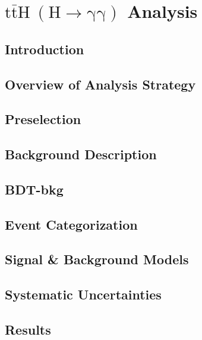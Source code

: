 \chapter{$\mathrm{t\bar{t}H~(H \to \gamma \gamma)}$ Analysis}

\section{Introduction} \label{sec:tth_intro}


\section{Overview of Analysis Strategy} \label{sec:tth_analysis_strategy}


\section{Preselection} \label{sec:tth_presel}


\section{Background Description} \label{sec:tth_background_description}


\section{BDT-bkg} \label{sec:tth_mvas}


\section{Event Categorization} \label{sec:tth_event_categorization}

\section{Signal \& Background Models} \label{sec:sig_bkg_models}

\section{Systematic Uncertainties} \label{sec:tth_systematic_uncertainties}

\section{Results} \label{sec:tth_results}
